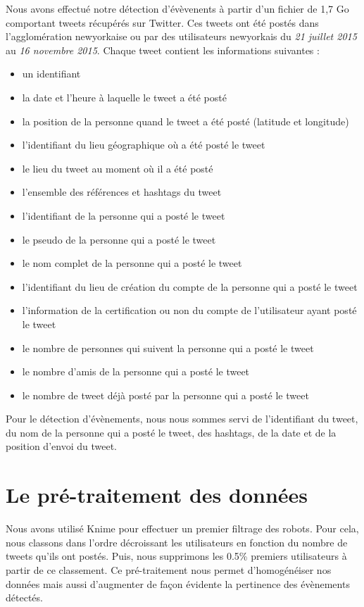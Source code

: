 \documentclass[12pt]{article}
\begin{document}
Nous avons effectu\'e notre d\'etection d'\'ev\`evenents \`a partir d'un fichier de 1,7 Go comportant  tweets  r\'ecup\'er\'es sur Twitter. Ces tweets ont \'et\'e post\'es dans l'agglom\'eration newyorkaise ou par des utilisateurs newyorkais du \textit{21 juillet 2015} au \textit{16 novembre 2015}. Chaque tweet contient les informations suivantes :

\begin{itemize}
	\item un identifiant
	\item la date et l'heure \`a laquelle le tweet a \'et\'e post\'e
	\item la position de la personne quand le tweet a \'et\'e post\'e (latitude et longitude)
	\item l'identifiant du lieu g\'eographique o\`u a \'et\'e post\'e le tweet
	\item le lieu du tweet au moment o\`u il a \'et\'e post\'e
	\item l'ensemble des r\'ef\'erences et hashtags du tweet
	\item l'identifiant de la personne qui a post\'e le tweet
	\item le pseudo de la personne qui a post\'e le tweet
	\item le nom complet de la personne qui a post\'e le tweet
	\item l'identifiant du lieu de cr\'eation du compte de la personne qui a post\'e le tweet
	\item l'information de la certification ou non du compte de l'utilisateur ayant post\'e le tweet
	\item le nombre de personnes qui suivent la personne qui a post\'e le tweet
	\item le nombre d'amis de la personne qui a post\'e le tweet
	\item le nombre de tweet d\'ej\`a post\'e par la personne qui a post\'e le tweet
\end{itemize}

Pour le d\'etection d'\'ev\`enements, nous nous sommes servi de l'identifiant du tweet, du nom de la personne qui a post\'e le
tweet, des hashtags, de la date et de la position d'envoi du tweet.

\section{Le pr\'e-traitement des donn\'ees}

Nous avons utilis\'e Knime pour effectuer un premier filtrage des robots. Pour cela, nous classons dans l'ordre d\'ecroissant les utilisateurs en fonction du nombre de tweets qu'ils ont post\'es. Puis, nous supprimons les 0.5\% premiers utilisateurs \`{a} partir de ce classement. Ce pr\'e-traitement nous permet d'homog\'en\'eiser nos donn\'ees mais aussi d'augmenter de fa\c{c}on \'evidente la pertinence des \'ev\`enements d\'etect\'es. 
\end{document}
